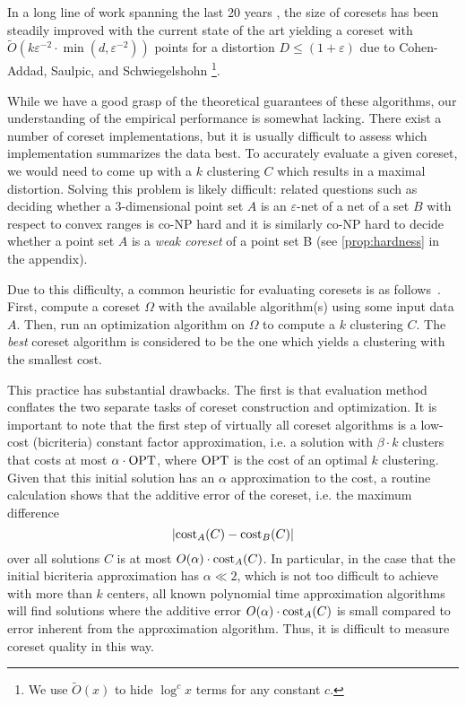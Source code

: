In a long line of work spanning the last 20 years \cite{BecchettiBC0S19,BravermanJKW21,Chen09,FL11,FeldmanSS20,
HaM04,HaK07,huang2020coresets,BravermanJKW21,LS10,SohlerW18}, the size of coresets has been steadily improved with the current state of the art yielding a coreset with $\tilde{O}(k \varepsilon^{-2} \cdot \min(d,\varepsilon^{-2}))$ points for a distortion $D\leq (1+\varepsilon)$ due to Cohen-Addad, Saulpic, and Schwiegelshohn \cite{Cohen-AddadSS21}\footnote{We use $\tilde O(x)$ to hide $\log^c x$ terms for any constant $c$.}.

While we have a good grasp of the theoretical guarantees of these algorithms, our understanding of the empirical performance is somewhat lacking. There exist a number of coreset implementations, but it is usually difficult to assess which implementation summarizes the data best. To accurately evaluate a given coreset, we would need to come up with a $k$ clustering $C$ which results in a maximal distortion. Solving this problem is likely difficult: related questions such as deciding whether a 3-dimensional point set $A$ is an $\varepsilon$-net of a  net of a set $B$ with respect to convex ranges is co-NP hard \cite{GiannopoulosKWW12} and it is similarly co-NP hard to decide whether a point set $A$ is a \emph{weak coreset} of a point set B (see \cref{prop:hardness} in the appendix). 

Due to this difficulty, a common heuristic for evaluating coresets is as follows~\cite{AckermannMRSLS12,FGSSS13}. First, compute a coreset $\Omega$ with the available algorithm(s) using some input data $A$. Then, run an optimization algorithm on $\Omega$ to compute a $k$ clustering $C$. The \emph{best} coreset algorithm is considered to be the one which yields a clustering with the smallest cost.

This practice has substantial drawbacks.
The first is that evaluation method conflates the two separate tasks of coreset construction and optimization.
It is important to note that the first step of virtually all coreset algorithms is a low-cost (bicriteria) constant factor approximation, i.e. a solution with $\beta\cdot k$ clusters that costs at most $\alpha\cdot \text{OPT}$, where $\text{OPT}$ is the cost of an optimal $k$ clustering.
Given that this initial solution has an $\alpha$ approximation to the cost, a routine calculation shows that the additive error of the coreset, i.e. the maximum difference
$$ \left\vert \text{cost}_A(C) - \text{cost}_B(C) \right\vert $$
over all solutions $C$ is at most $O(\alpha)\cdot \text{cost}_A(C)$. In particular, in the case that the initial bicriteria approximation has $\alpha \ll 2$, which is not too difficult to achieve with more than $k$ centers, all known polynomial time approximation algorithms will find solutions where the additive error $O(\alpha)\cdot \text{cost}_A(C)$ is small compared to error inherent from the approximation algorithm. Thus, it is difficult to measure coreset quality in this way. 

